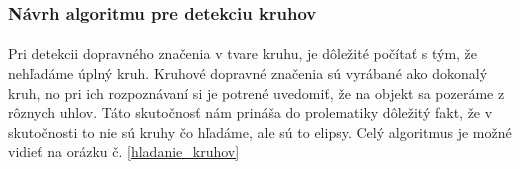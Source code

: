 \documentclass[12pt]{article}
\begin{document}
\subsubsection{Návrh algoritmu pre detekciu kruhov}
\paragraph{}
Pri detekcii dopravného značenia v tvare kruhu, je dôležité počítať s tým, že nehľadáme úplný kruh. Kruhové dopravné značenia sú vyrábané ako dokonalý kruh,
no pri ich rozpoznávaní si je potrené uvedomiť, že na objekt sa pozeráme z rôznych uhlov. Táto skutočnosť nám prináša do prolematiky dôležitý fakt,
že v skutočnosti to nie sú kruhy čo hľadáme, ale sú to elipsy. Celý algoritmus je možné vidieť na orázku č. \ref{hladanie_kruhov}

\end{document}
